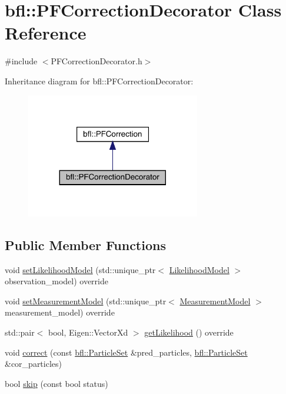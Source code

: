 \hypertarget{classbfl_1_1PFCorrectionDecorator}{}\section{bfl\+:\+:P\+F\+Correction\+Decorator Class Reference}
\label{classbfl_1_1PFCorrectionDecorator}


{\ttfamily \#include $<$P\+F\+Correction\+Decorator.\+h$>$}



Inheritance diagram for bfl\+:\+:P\+F\+Correction\+Decorator\+:
\nopagebreak
\begin{figure}[H]
\begin{center}
\leavevmode
\includegraphics[width=215pt]{classbfl_1_1PFCorrectionDecorator__inherit__graph}
\end{center}
\end{figure}
\subsection*{Public Member Functions}
\begin{DoxyCompactItemize}
\item 
void \mbox{\hyperlink{classbfl_1_1PFCorrectionDecorator_ab1065f8e47e4e51bc846b2d693b4bb88}{set\+Likelihood\+Model}} (std\+::unique\+\_\+ptr$<$ \mbox{\hyperlink{classbfl_1_1LikelihoodModel}{Likelihood\+Model}} $>$ observation\+\_\+model) override
\item 
void \mbox{\hyperlink{classbfl_1_1PFCorrectionDecorator_a6e96dbb6591e44d9ebaa186c6e50569b}{set\+Measurement\+Model}} (std\+::unique\+\_\+ptr$<$ \mbox{\hyperlink{classbfl_1_1MeasurementModel}{Measurement\+Model}} $>$ measurement\+\_\+model) override
\item 
std\+::pair$<$ bool, Eigen\+::\+Vector\+Xd $>$ \mbox{\hyperlink{classbfl_1_1PFCorrectionDecorator_a019f207b8348f5f61e700e8a4ca38bfd}{get\+Likelihood}} () override
\item 
void \mbox{\hyperlink{classbfl_1_1PFCorrection_a560666b2e7566a846cb4ce4684e195e0}{correct}} (const \mbox{\hyperlink{classbfl_1_1ParticleSet}{bfl\+::\+Particle\+Set}} \&pred\+\_\+particles, \mbox{\hyperlink{classbfl_1_1ParticleSet}{bfl\+::\+Particle\+Set}} \&cor\+\_\+particles)
\item 
bool \mbox{\hyperlink{classbfl_1_1PFCorrection_ab25e625ea12fe257e0eb85d465835e62}{skip}} (const bool status)
\end{DoxyCompactItemize}

